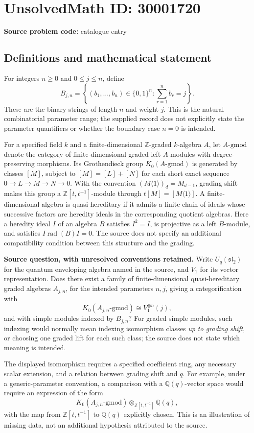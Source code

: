 \documentclass[11pt]{article}
\newcommand{\Z}{\mathbb{Z}}
\newcommand{\Q}{\mathbb{Q}}
\begin{document}
\section*{UnsolvedMath ID: 30001720}
\textbf{Source problem code:} catalogue entry
\subsection{Definitions and mathematical statement}
For integers \(n\geq 0\) and \(0\leq j\leq n\), define
\[
B_{j,n}=\left\{(b_1,\ldots,b_n)\in\{0,1\}^n:\sum_{r=1}^{n}b_r=j\right\}.
\]
These are the binary strings of length \(n\) and weight \(j\). This is the natural combinatorial parameter range; the supplied record does not explicitly state the parameter quantifiers or whether the boundary case \(n=0\) is intended.

For a specified field \(k\) and a finite-dimensional \(\Z\)-graded \(k\)-algebra \(A\), let \(A\text{-gmod}\) denote the category of finite-dimensional graded left \(A\)-modules with degree-preserving morphisms. Its Grothendieck group \(K_0(A\text{-gmod})\) is generated by classes \([M]\), subject to \([M]=[L]+[N]\) for each short exact sequence \(0\to L\to M\to N\to0\). With the convention \((M\langle1\rangle)_d=M_{d-1}\), grading shift makes this group a \(\Z[t,t^{-1}]\)-module through \(t[M]=[M\langle1\rangle]\). A finite-dimensional algebra is quasi-hereditary if it admits a finite chain of ideals whose successive factors are heredity ideals in the corresponding quotient algebras. Here a heredity ideal \(I\) of an algebra \(B\) satisfies \(I^2=I\), is projective as a left \(B\)-module, and satisfies \(I\operatorname{rad}(B)I=0\). The source does not specify an additional compatibility condition between this structure and the grading.

\textbf{Source question, with unresolved conventions retained.} Write \(U_q(\mathfrak{sl}_2)\) for the quantum enveloping algebra named in the source, and \(V_1\) for its vector representation. Does there exist a family of finite-dimensional quasi-hereditary graded algebras \(A_{j,n}\), for the intended parameters \(n,j\), giving a categorification with
\[
K_0(A_{j,n}\text{-gmod})\cong V_1^{\otimes n}(j),
\]
and with simple modules indexed by \(B_{j,n}\)? For graded simple modules, such indexing would normally mean indexing isomorphism classes \emph{up to grading shift}, or choosing one graded lift for each such class; the source does not state which meaning is intended.

The displayed isomorphism requires a specified coefficient ring, any necessary scalar extension, and a relation between grading shift and \(q\). For example, under a generic-parameter convention, a comparison with a \(\Q(q)\)-vector space would require an expression of the form
\[
K_0(A_{j,n}\text{-gmod})\otimes_{\Z[t,t^{-1}]}\Q(q),
\]
with the map from \(\Z[t,t^{-1}]\) to \(\Q(q)\) explicitly chosen. This is an illustration of missing data, not an additional hypothesis attributed to the source.
\end{document}
